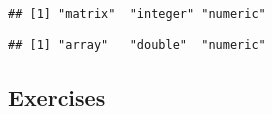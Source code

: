 \begin{verbatim}
## [1] "matrix"  "integer" "numeric"
\end{verbatim}

\begin{Shaded}
\begin{Highlighting}[]
\NormalTok{(}\NormalTok{(}\NormalTok{))}
\end{Highlighting}
\end{Shaded}

\begin{verbatim}
## [1] "array"   "double"  "numeric"
\end{verbatim}

\hypertarget{exercises}{%
\subsection{Exercises}\label{exercises}}

